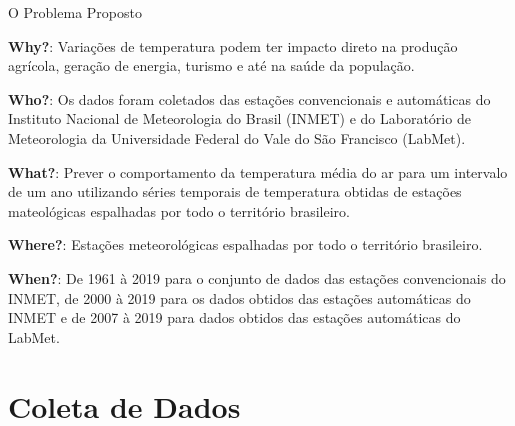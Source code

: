 \documentclass[aspectratio=169]{beamer}
\begin{document}
\begin{frame}{O Problema Proposto}

\textbf{Why?}: Variações de temperatura podem ter impacto direto na produção agrícola, geração de energia, turismo e até na saúde da população.
\pause

\textbf{Who?}: Os dados foram coletados das estações convencionais e automáticas do Instituto Nacional de Meteorologia do Brasil (INMET) e do Laboratório de Meteorologia da Universidade Federal do Vale do São Francisco (LabMet).
\pause

\textbf{What?}: Prever o comportamento da temperatura média do ar para um intervalo de um ano utilizando séries temporais de temperatura obtidas de estações mateológicas espalhadas por todo o território brasileiro.
\pause

\textbf{Where?}: Estações meteorológicas espalhadas por todo o território brasileiro.  
\pause

\textbf{When?}: De 1961 à 2019 para o conjunto de dados das estações convencionais do INMET, de 2000 à 2019 para os dados obtidos das estações automáticas do INMET e de 2007 à 2019 para dados obtidos das estações automáticas do LabMet. 

\end{frame}

\section{Coleta de Dados}
\end{document}

